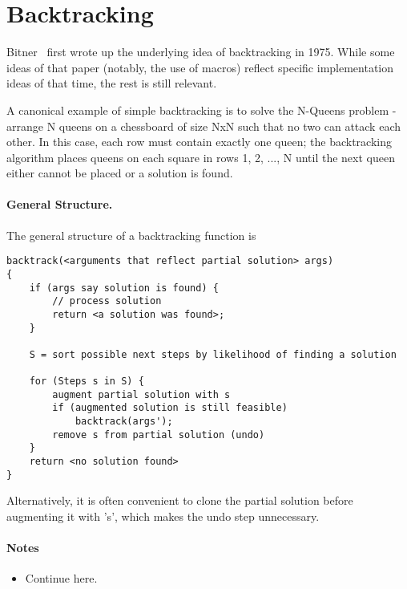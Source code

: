 \section{Backtracking}
\label{sec:backtracking}

Bitner~\cite{Bitner:1975} first wrote up the underlying idea of backtracking in 1975.
While some ideas of that paper (notably, the use of macros) reflect specific implementation
ideas of that time, the rest is still relevant.

A canonical example of simple backtracking is to solve the N-Queens problem - arrange N queens
on a chessboard of size NxN such that no two can attack each other.  In this case, each
row must contain exactly one queen; the backtracking algorithm places queens on each square
in rows 1, 2, ..., N until the next queen either cannot be placed or a solution is found.


\paragraph{General Structure.}
The general structure of a backtracking function is
\begin{verbatim}
backtrack(<arguments that reflect partial solution> args)
{
    if (args say solution is found) {
        // process solution
        return <a solution was found>;
    }

    S = sort possible next steps by likelihood of finding a solution

    for (Steps s in S) {
        augment partial solution with s
        if (augmented solution is still feasible)
            backtrack(args');
        remove s from partial solution (undo)
    }
    return <no solution found>
}
\end{verbatim}
Alternatively, it is often convenient to clone the partial solution before augmenting it
with 's', which makes the undo step unnecessary.

\paragraph{Notes}
\begin{itemize}
\item Continue here.
\end{itemize}
